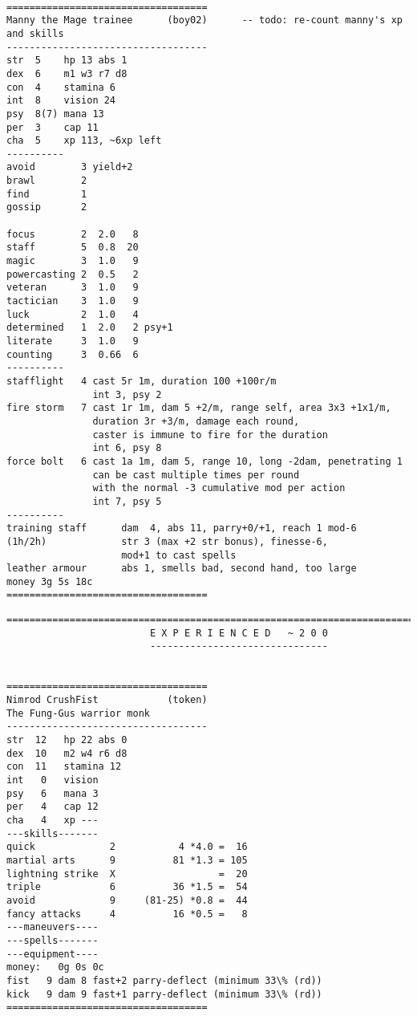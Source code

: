 \


\goodbreak
\tiny \begin{samepage} \begin{verbatim}
===================================
Manny the Mage trainee      (boy02)      -- todo: re-count manny's xp and skills
-----------------------------------
str  5    hp 13 abs 1
dex  6    m1 w3 r7 d8
con  4    stamina 6
int  8    vision 24
psy  8(7) mana 13
per  3    cap 11
cha  5    xp 113, ~6xp left
----------
avoid        3 yield+2
brawl        2
find         1
gossip       2

focus        2  2.0   8
staff        5  0.8  20
magic        3  1.0   9
powercasting 2  0.5   2
veteran      3  1.0   9
tactician    3  1.0   9
luck         2  1.0   4
determined   1  2.0   2 psy+1
literate     3  1.0   9
counting     3  0.66  6
----------
stafflight   4 cast 5r 1m, duration 100 +100r/m
               int 3, psy 2
fire storm   7 cast 1r 1m, dam 5 +2/m, range self, area 3x3 +1x1/m,
               duration 3r +3/m, damage each round,
               caster is immune to fire for the duration
               int 6, psy 8
force bolt   6 cast 1a 1m, dam 5, range 10, long -2dam, penetrating 1
               can be cast multiple times per round
               with the normal -3 cumulative mod per action
               int 7, psy 5
----------
training staff      dam  4, abs 11, parry+0/+1, reach 1 mod-6
(1h/2h)             str 3 (max +2 str bonus), finesse-6,
                    mod+1 to cast spells
leather armour      abs 1, smells bad, second hand, too large
money 3g 5s 18c
===================================
\end{verbatim} \end{samepage} \normalsize













\clearpage

\goodbreak
\tiny \begin{samepage} \begin{verbatim}
================================================================================
                         E X P E R I E N C E D   ~ 2 0 0
                         -------------------------------


===================================
Nimrod CrushFist            (token)
The Fung-Gus warrior monk
-----------------------------------
str  12   hp 22 abs 0
dex  10   m2 w4 r6 d8
con  11   stamina 12
int   0   vision
psy   6   mana 3
per   4   cap 12
cha   4   xp ---
---skills-------
quick             2           4 *4.0 =  16
martial arts      9          81 *1.3 = 105
lightning strike  X                  =  20
triple            6          36 *1.5 =  54
avoid             9     (81-25) *0.8 =  44
fancy attacks     4          16 *0.5 =   8
---maneuvers----
---spells-------
---equipment----
money:   0g 0s 0c
fist   9 dam 8 fast+2 parry-deflect (minimum 33\% (rd))
kick   9 dam 9 fast+1 parry-deflect (minimum 33\% (rd))
===================================
\end{verbatim} \end{samepage} \normalsize


